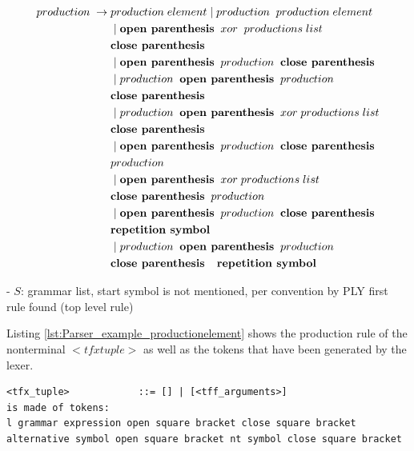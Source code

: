 \begin{align*}
	production\; \rightarrow\; &production\; element
                \mid production\;\; production\; element \\
               &\mid \textbf{open parenthesis}\;\; xor\; \;productions\; list\;\; \\
               &\textbf{close parenthesis} \\
               &\mid \textbf{open parenthesis}\;\; production\;\; \textbf{close parenthesis} \\
               &\mid production \;\;\textbf{open parenthesis}\;\; production \\
               &\textbf{close parenthesis} \\
               &\mid production\;\; \textbf{open parenthesis} \;\;xor \;productions\; list\\
               &\textbf{close parenthesis} \\
               &\mid \textbf{open parenthesis} \;\;production \;\;\textbf{close parenthesis} \\
               &production \\
               &\mid \textbf{open parenthesis}\;\; xor\; productions\; list\\ 
               &\textbf{close parenthesis}\;\; production \\
               &\mid \textbf{open parenthesis}\;\; production\;\; \textbf{close parenthesis} \\
               &\textbf{repetition symbol}\\
               &\mid production\;\; \textbf{open parenthesis} \;\;production \\
               &\textbf{close parenthesis \; repetition symbol}
\end{align*}


- $S$: grammar list, start symbol is not mentioned, per convention by \ac{PLY} first rule found (top level rule)

Listing \ref{lst:Parser_example_productionelement} shows the production rule of the nonterminal $<tfx tuple>$ as well as the tokens that have been generated by the lexer.

\begin{lstlisting}[basicstyle=\scriptsize	,caption= Production element,label= lst:Parser_example_productionelement]
<tfx_tuple>            ::= [] | [<tff_arguments>]
is made of tokens:
l grammar expression open square bracket close square bracket alternative symbol open square bracket nt symbol close square bracket
\end{lstlisting}


